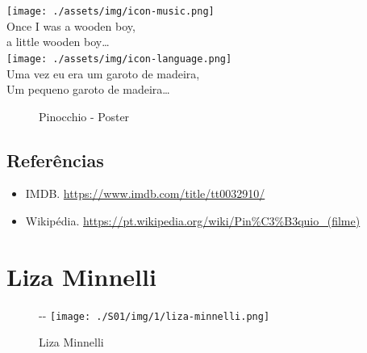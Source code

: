 \bigskip
\begin{tcolorbox}[enhanced,
    drop fuzzy shadow southeast, boxrule=0.3pt,
    lower separated=false, sidebyside, sidebyside align=top,
    halign=flush right, halign lower=left,
    colframe=black!30!dialogoBorder,colback=musicaBg]
\texttt{[image: ./assets/img/icon-music.png]}\\
Once I was a wooden boy,\\a little wooden boy…\\
\tcblower
\texttt{[image: ./assets/img/icon-language.png]}\\
Uma vez eu era um garoto de madeira,\\Um pequeno garoto de madeira…\\
\end{tcolorbox}

\begin{figure}
  \centering
    \caption{Pinocchio - Poster\label{fig:pinocchio-poster}}
\end{figure}

\hypertarget{referuxeancias-7}{%
\subsection{Referências}\label{referuxeancias-7}}

\begin{itemize}
\tightlist
\item
  \sloppy IMDB. \url{https://www.imdb.com/title/tt0032910/}
\item
  \sloppy Wikipédia. \url{https://pt.wikipedia.org/wiki/Pin%C3%B3quio_(filme)}
\end{itemize}

\hypertarget{liza-minnelli}{%
\section{Liza Minnelli}\label{liza-minnelli}}

\begin{figure}[!ht]
  \begin{adjustwidth}{-\oddsidemargin-1in}{-\rightmargin}
    \centering
    \texttt{[image: ./S01/img/1/liza-minnelli.png]}
    \caption{Liza Minnelli\label{fig:liza-minnelli}}
  \end{adjustwidth}
\end{figure}

